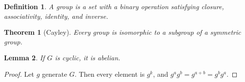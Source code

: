 \documentclass{article}
\newtheorem{theorem}{Theorem}
\newtheorem{lemma}[theorem]{Lemma}
\newtheorem{definition}{Definition}
\begin{document}
\begin{definition}
A group is a set with a binary operation satisfying closure, associativity, identity, and inverse.
\end{definition}
\begin{theorem}[Cayley]
Every group is isomorphic to a subgroup of a symmetric group.
\end{theorem}
\begin{lemma}
If $G$ is cyclic, it is abelian.
\end{lemma}
\begin{proof}
Let $g$ generate $G$. Then every element is $g^k$, and $g^a g^b = g^{a+b} = g^b g^a$.
\end{proof}
\end{document}
